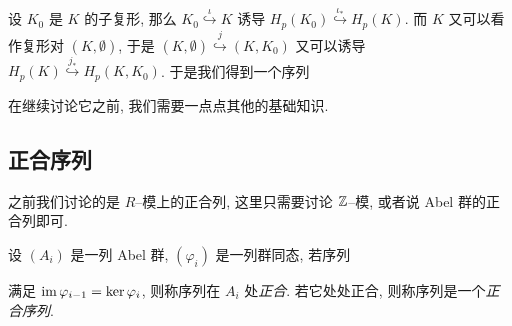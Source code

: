 设 $ K_0 $ 是 $ K $ 的子复形, 那么 $ K_0\stackrel{\iota}{\hookrightarrow}K $ 诱导 $ H_p(K_0)\stackrel{\iota_*}{\hookrightarrow}H_p(K) $. 而 $ K $ 又可以看作复形对 $ (K,\emptyset) $, 于是 $ (K,\emptyset)\stackrel{j}{\hookrightarrow}(K,K_0) $ 又可以诱导 $ H_p(K)\stackrel{j_*}{\hookrightarrow}H_p(K,K_0) $. 于是我们得到一个序列
\begin{center}
\end{center}
在继续讨论它之前, 我们需要一点点其他的基础知识.

\subsection{正合序列}

之前我们讨论的是 $ R $--模上的正合列, 这里只需要讨论 $ \mathbb{Z} $--模, 或者说 Abel 群的正合列即可.

\begin{Definition}[正合序列]
	设 $ (A_i) $ 是一列 Abel 群, $ (\varphi_i) $ 是一列群同态, 若序列
	\begin{center}
	\end{center}
	满足 $ \mathrm{im}\,\varphi_{i-1}=\ker\varphi_i $, 则称序列在 $ A_i $ 处\emph{正合}. 若它处处正合, 则称序列是一个\emph{正合序列}.
\end{Definition}

